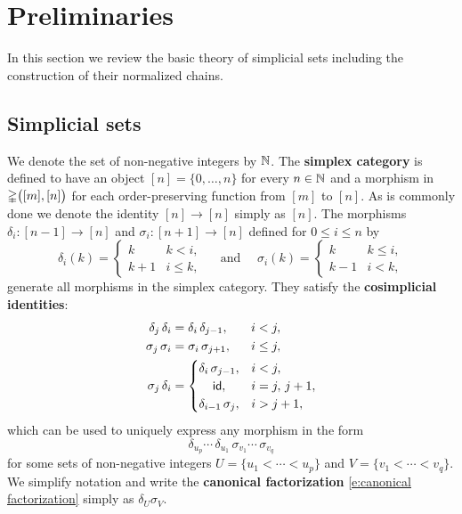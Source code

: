 
\section{Preliminaries} \label{s:preliminaries}

In this section we review the basic theory of simplicial sets including the construction of their normalized chains.

\subsection{Simplicial sets}

We denote the set of non-negative integers by $\mathbb{N}$.
The \textbf{simplex category} is defined to have an object $[n] = \{0, \dots, n\}$ for every $n \in \mathbb{N}$ and a morphism in $\mathbb{\Delta} \big([m], [n] \big)$ for each order-preserving function from $[m]$ to $[n]$.
As is commonly done we denote the identity $[n] \to [n]$ simply as $[n]$.
The morphisms $\delta_i \colon [n-1] \to [n]$ and $\sigma_i \colon [n+1] \to [n]$ defined for $0 \leq i \leq n$ by
\[
\delta_i(k) =
\begin{cases} k & k < i, \\ k+1 & i \leq k, \end{cases}
\quad \text{ and } \quad
\sigma_i(k) =
\begin{cases} k & k \leq i, \\ k-1 & i < k, \end{cases}
\]
generate all morphisms in the simplex category.
They satisfy the \textbf{cosimplicial identities}:
\begin{equation} \label{e:cosimplicial identities}
\begin{split}
\delta_j \, \delta_i &=
\delta_i \, \delta_{j-1}, \hspace*{18.3pt} i < j, \\
\sigma_j \, \sigma_i &=
\sigma_i \, \sigma_{j+1}, \hspace*{15.9pt} i \leq j, \\
\sigma_j \, \delta_i &=
\begin{cases}
\delta_i \, \sigma_{j-1}, & i < j, \\
\hfil \id, & i = j,\, j+1, \\
\delta_{i-1} \, \sigma_{j}, & i > j + 1,
\end{cases}
\end{split}
\end{equation}
which can be used to uniquely express any morphism in the form
\begin{equation} \label{e:canonical factorization}
\delta_{u_{p}} \cdots\, \delta_{u_1}\, \sigma_{v_1} \cdots\, \sigma_{v_q}
\end{equation}
for some sets of non-negative integers $U = \{u_1 < \cdots < u_{p}\}$ and $V = \{v_1 < \cdots < v_{q}\}$.
We simplify notation and write the \textbf{canonical factorization} \eqref{e:canonical factorization} simply as $\delta_U \sigma_V$.

